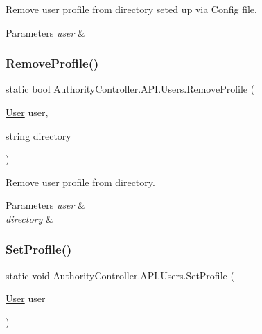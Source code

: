 Remove user profile from directory seted up via Config file. 


\begin{DoxyParams}{Parameters}
{\em user} & \\
\hline
\end{DoxyParams}
\mbox{\label{class_authority_controller_1_1_a_p_i_1_1_users_aa57a37410c6bc6a47ee79c0d3438b028}} 
\subsubsection{\texorpdfstring{Remove\+Profile()}{RemoveProfile()}\hspace{0.1cm}{\footnotesize\ttfamily [2/2]}}
{\footnotesize\ttfamily static bool Authority\+Controller.\+A\+P\+I.\+Users.\+Remove\+Profile (\begin{DoxyParamCaption}\item[{\mbox{\hyperlink{class_authority_controller_1_1_data_1_1_user}{User}}}]{user,  }\item[{string}]{directory }\end{DoxyParamCaption})\hspace{0.3cm}{\ttfamily [static]}}



Remove user profile from directory. 


\begin{DoxyParams}{Parameters}
{\em user} & \\
\hline
{\em directory} & \\
\hline
\end{DoxyParams}
\mbox{\label{class_authority_controller_1_1_a_p_i_1_1_users_a5d8242dfe20d058ea78d9f50b3b3c3cd}} 
\subsubsection{\texorpdfstring{Set\+Profile()}{SetProfile()}\hspace{0.1cm}{\footnotesize\ttfamily [1/2]}}
{\footnotesize\ttfamily static void Authority\+Controller.\+A\+P\+I.\+Users.\+Set\+Profile (\begin{DoxyParamCaption}\item[{\mbox{\hyperlink{class_authority_controller_1_1_data_1_1_user}{User}}}]{user }\end{DoxyParamCaption})\hspace{0.3cm}{\ttfamily [static]}}



